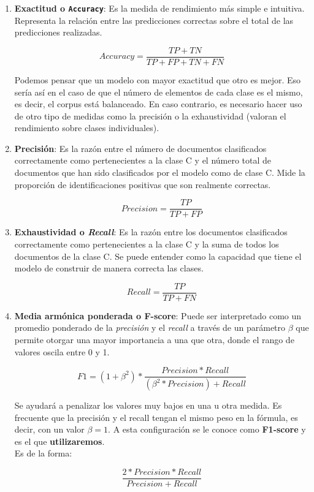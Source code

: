 \documentclass[a4paper,12pt]{report}
\begin{document}
\begin{enumerate}

\item \textbf{Exactitud o \texttt{Accuracy}}: Es la medida de rendimiento más simple e intuitiva. Representa la relación entre las predicciones correctas sobre el total de las predicciones realizadas. 

\[  Accuracy = \frac{TP + TN}{TP + FP + TN + FN} \]

\vspace{4mm}
Podemos pensar que un modelo con mayor exactitud que otro es mejor. Eso sería así en el caso de que el número de elementos de cada clase es el mismo, es decir, el corpus está balanceado. En caso contrario, es necesario hacer uso de otro tipo de medidas como la precisión o la exhaustividad (valoran el rendimiento sobre clases individuales). 

\vspace{4mm}
\item \textbf{Precisión}: Es la razón entre el número de documentos clasificados correctamente como pertenecientes a la clase C y el número total de documentos que han sido clasificados por el modelo como de clase C. Mide la proporción de identificaciones positivas que son realmente correctas.

\[ Precision = \frac{TP}{TP + FP} \]

\vspace{4mm}
\item \textbf{Exhaustividad o \textit{Recall}}: Es la razón entre los documentos clasificados correctamente como pertenecientes a la clase C y la suma de todos los documentos de la clase C. Se puede entender como la capacidad que tiene el modelo de construir de manera correcta las clases.

\[ Recall = \frac{TP}{TP + FN} \]

\vspace{4mm}
\item \textbf{Media armónica ponderada o F-score}: Puede ser interpretado como un promedio ponderado de la \textit{precisión} y el \textit{recall} a través de un parámetro $\beta$ que permite otorgar una mayor importancia a una que otra, donde el rango de valores oscila entre 0 y 1. 

\[ F1 = (1 + \beta^{2})*  \frac{Precision * Recall}{(\beta^{2}*Precision) + Recall} \]

\vspace{4mm}
Se ayudará a penalizar los valores muy bajos en una u otra medida. Es frecuente que la precisión y el recall tengan el mismo peso en la fórmula, es decir, con un valor $\beta = 1$. A esta configuración se le conoce como \textbf{F1-score} y es el que \textbf{utilizaremos}.\\ Es de la forma:

\[ \frac{2*Precision*Recall}{Precision + Recall} \]
\vspace{4mm}
\end{enumerate}
\end{document}
